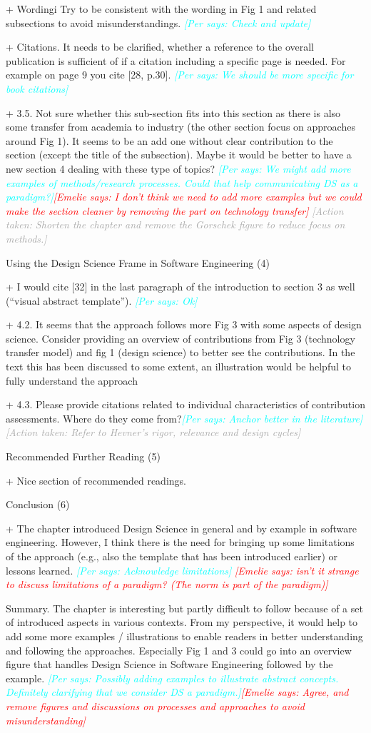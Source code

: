 \documentclass{article}
\newcommand{\emelie}[1]{\textcolor{red}{{\it [Emelie says: #1]}}}
\newcommand{\per}[1]{\textcolor{cyan}{{\it [Per says: #1]}}}
\newcommand{\action}[1]{\textcolor{darkgray}{{\it [Action taken: #1]}}}
\newcommand{\emelie}[1]{}
\newcommand{\per}[1]{}
\newcommand{\action}[1]{}
\begin{document}
+ Wordingi Try to be consistent with the wording in Fig 1 and related subsections to avoid misunderstandings. \per{Check and update}

+ Citations. It needs to be clarified, whether a reference to the overall publication is sufficient of if a citation including a specific page is needed. For example on page 9 you cite [28, p.30]. \per{We should be more specific for book citations}

+ 3.5. Not sure whether this sub-section fits into this section as there is also some transfer from academia to industry (the other section focus on approaches around Fig 1). It seems to be an add one without clear contribution to the section (except the title of the subsection). Maybe it would be better to have a new section 4 dealing with these type of topics? \per{We might add more examples of methods/research processes. Could that help communicating DS as a paradigm?}\emelie{I don't think we need to add more examples but we could make the section cleaner by removing the part on technology transfer} \action{Shorten the chapter and remove the Gorschek figure to reduce focus on  methods.}


Using the Design Science Frame in Software Engineering (4)

+ I would cite [32] in the last paragraph of the introduction to section 3 as well (“visual abstract template”). \per{Ok}

+ 4.2. It seems that the approach follows more Fig 3 with some aspects of design science. Consider providing an overview of contributions from Fig 3 (technology transfer model) and fig 1 (design science) to better see the contributions. In the text this has been discussed to some extent, an illustration would be helpful to fully understand the approach

+ 4.3. Please provide citations related to individual characteristics of contribution assessments. Where do they come from?\per{Anchor better in the literature} \action{Refer to Hevner's rigor, relevance and design cycles}

Recommended Further Reading (5)

+ Nice section of recommended readings.

Conclusion (6)

+ The chapter introduced Design Science in general and by example in software engineering. However, I think there is the need for bringing up some limitations of the approach (e.g., also the template that has been introduced earlier) or lessons learned. \per{Acknowledge limitations} \emelie{isn't it strange to discuss limitations of a paradigm? (The norm is part of the paradigm)}

Summary. The chapter is interesting but partly difficult to follow because of a set of introduced aspects in various contexts. From my perspective, it would help to add some more examples / illustrations to enable readers in better understanding and following the approaches. Especially Fig 1 and 3 could go into an overview figure that handles Design Science in Software Engineering followed by the example. \per{Possibly adding examples to illustrate abstract concepts. Definitely clarifying that we consider DS a paradigm.}\emelie{Agree, and remove figures and discussions on processes and approaches to avoid misunderstanding}
\end{document}
